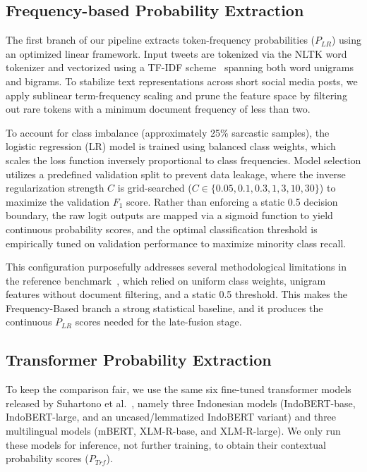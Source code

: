 \documentclass[conference]{IEEEtran}
\begin{document}
\subsection{Frequency-based Probability Extraction}

The first branch of our pipeline extracts token-frequency probabilities ($P_{LR}$) using an optimized linear framework. Input tweets are tokenized via the NLTK word tokenizer and vectorized using a TF-IDF scheme~\cite{salton1988term} spanning both word unigrams and bigrams. To stabilize text representations across short social media posts, we apply sublinear term-frequency scaling and prune the feature space by filtering out rare tokens with a minimum document frequency of less than two.

To account for class imbalance (approximately 25\% sarcastic samples), the logistic regression (LR) model is trained using balanced class weights, which scales the loss function inversely proportional to class frequencies. Model selection utilizes a predefined validation split to prevent data leakage, where the inverse regularization strength $C$ is grid-searched ($C \in \{0.05, 0.1, 0.3, 1, 3, 10, 30\}$) to maximize the validation $F_1$ score. Rather than enforcing a static 0.5 decision boundary, the raw logit outputs are mapped via a sigmoid function to yield continuous probability scores, and the optimal classification threshold is empirically tuned on validation performance to maximize minority class recall. 

This configuration purposefully addresses several methodological limitations in the reference benchmark~\cite{idsarcasm}, which relied on uniform class weights, unigram features without document filtering, and a static 0.5 threshold. This makes the Frequency-Based branch a strong statistical baseline, and it produces the continuous $P_{LR}$ scores needed for the late-fusion stage.

\subsection{Transformer Probability Extraction}

To keep the comparison fair, we use the same six fine-tuned transformer models released by Suhartono et al.~\cite{idsarcasm}, namely three Indonesian models (IndoBERT-base, IndoBERT-large, and an uncased/lemmatized IndoBERT variant) and three multilingual models (mBERT, XLM-R-base, and XLM-R-large). We only run these models for inference, not further training, to obtain their contextual probability scores ($P_{Trf}$).
\end{document}
